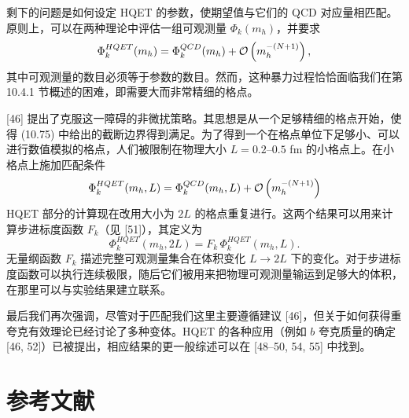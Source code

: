 剩下的问题是如何设定 HQET 的参数，使期望值与它们的 QCD 对应量相匹配。原则上，可以在两种理论中评估一组可观测量 $\Phi_k(m_h)$，并要求
\begin{equation}
  \Phi_k^{HQET}(m_h) = \Phi_k^{QCD}(m_h) + \mathcal{O}\left(m_h^{-(N+1)}\right) ,
\end{equation}
其中可观测量的数目必须等于参数的数目。然而，这种暴力过程恰恰面临我们在第 10.4.1 节概述的困难，即需要大而非常精细的格点。

[46] 提出了克服这一障碍的非微扰策略。其思想是从一个足够精细的格点开始，使得 (10.75) 中给出的截断边界得到满足。为了得到一个在格点单位下足够小、可以进行数值模拟的格点，人们被限制在物理大小 $L = 0.2$--$0.5$ fm 的小格点上。在小格点上施加匹配条件
\begin{equation}
  \Phi_k^{HQET}(m_h, L) = \Phi_k^{QCD}(m_h, L) + \mathcal{O}\left(m_h^{-(N+1)}\right)
\end{equation}
HQET 部分的计算现在改用大小为 $2L$ 的格点重复进行。这两个结果可以用来计算步进标度函数 $F_k$（见 [51]），其定义为
\begin{equation}
  \Phi_k^{HQET}(m_h, 2L) = F_k\, \Phi_k^{HQET}(m_h, L) .
\end{equation}
无量纲函数 $F_k$ 描述完整可观测量集合在体积变化 $L \to 2L$ 下的变化。对于步进标度函数可以执行连续极限，随后它们被用来把物理可观测量输运到足够大的体积，在那里可以与实验结果建立联系。

最后我们再次强调，尽管对于匹配我们这里主要遵循建议 [46]，但关于如何获得重夸克有效理论已经讨论了多种变体。HQET 的各种应用（例如 $b$ 夸克质量的确定 [46, 52]）已被提出，相应结果的更一般综述可以在 [48--50, 54, 55] 中找到。

\section*{参考文献}

